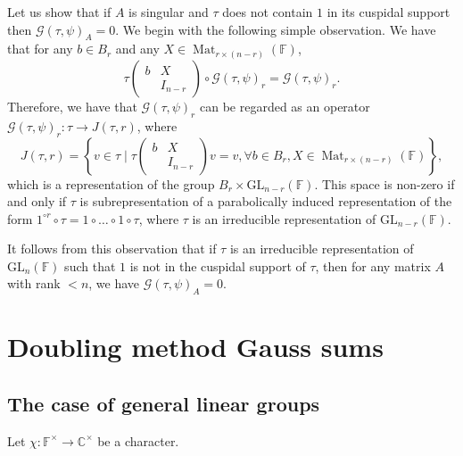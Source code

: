 \documentclass[12pt, reqno]{amsart}
\theoremstyle{definition}
\theoremstyle{definition}
\theoremstyle{definition}
\newcommand{\cComplex}{\mathbb{C}}
\newcommand{\multiplicativegroup}[1]{#1^{\times}}
\newcommand{\fieldCharacter}{\psi}
\newcommand{\IdentityMatrix}[1]{I_{#1}}
\newcommand{\GL}{\mathrm{GL}}
\newcommand{\finiteField}{\mathbb{F}}
\newcommand{\Mat}[2]{\operatorname{Mat}_{#1 \times #2}}
\newcommand{\GaussSum}[2]{\mathcal{G}\left(#1, #2\right)}
\begin{document}
Let us show that if $A$ is singular and $\tau$ does not contain $1$ in its cuspidal support then $\GaussSum{\tau}{\fieldCharacter}_A = 0$. We begin with the following simple observation. We have that for any $b \in B_r$ and any $X \in \Mat{r}{(n-r)}\left(\finiteField\right)$,
$$ \tau\begin{pmatrix}
	b & X\\
	& \IdentityMatrix{n-r}
\end{pmatrix} \circ \GaussSum{\tau}{\fieldCharacter}_r = \GaussSum{\tau}{\fieldCharacter}_r.$$
Therefore, we have that $\GaussSum{\tau}{\fieldCharacter}_r$ can be regarded as an operator $\GaussSum{\tau}{\fieldCharacter}_r \colon \tau \to J\left(\tau, r\right)$, where $$J\left(\tau, r\right) = \left\{ v \in \tau \mid \tau \begin{pmatrix}
	b & X\\
	& \IdentityMatrix{n-r}
\end{pmatrix} v = v, \forall b \in B_r, X \in \Mat{r}{(n-r)}\left(\finiteField\right) \right\},$$
which is a representation of the group $B_r \times \GL_{n-r}\left(\finiteField\right)$. This space is non-zero if and only if $\tau$ is subrepresentation of a parabolically induced representation of the form $1^{\circ r} \circ \tau = 1 \circ \dots \circ 1 \circ \tau$, where $\tau$ is an irreducible representation of $\GL_{n-r}\left(\finiteField\right)$. 

It follows from this observation that if $\tau$ is an irreducible representation of $\GL_n\left(\finiteField\right)$ such that $1$ is not in the cuspidal support of $\tau$, then for any matrix $A$ with rank $< n$, we have $\GaussSum{\tau}{\fieldCharacter}_A = 0$.

\section{Doubling method Gauss sums}

\subsection{The case of general linear groups}

Let $\chi \colon \multiplicativegroup{\finiteField} \to \multiplicativegroup{\cComplex}$ be a character.
\end{document}
